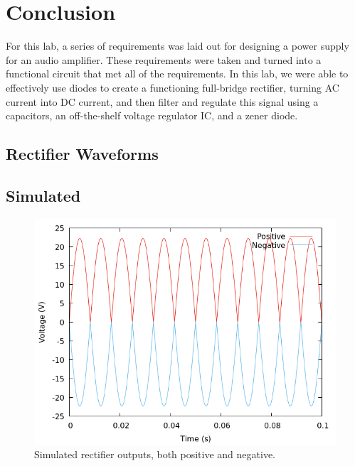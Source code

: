 \documentclass[12pt]{article}
\newcommand{\graphwidth}{0.5\linewidth}
\begin{document}
\section{Conclusion}

For this lab, a series of requirements was laid out for designing a power supply for an audio
amplifier. These requirements were taken and turned into a functional circuit that met
all of the requirements. In this lab, we were able to effectively use diodes to create
a functioning full-bridge rectifier, turning AC current into DC current, and then filter
and regulate this signal using a capacitors, an off-the-shelf voltage regulator IC, and
a zener diode.

\newpage

\begin{appendix}

\section{Rectifier Waveforms}

\subsection{Simulated}

\begin{figure}[H]
    \centering
    \includegraphics[width=\graphwidth]{./res/image/sim-rectifier-unfiltered.png}
    \caption{Simulated rectifier outputs, both positive and negative.}
    \label{sim:rectifier_unfiltered}
\end{figure}


\end{appendix}
\end{document}

